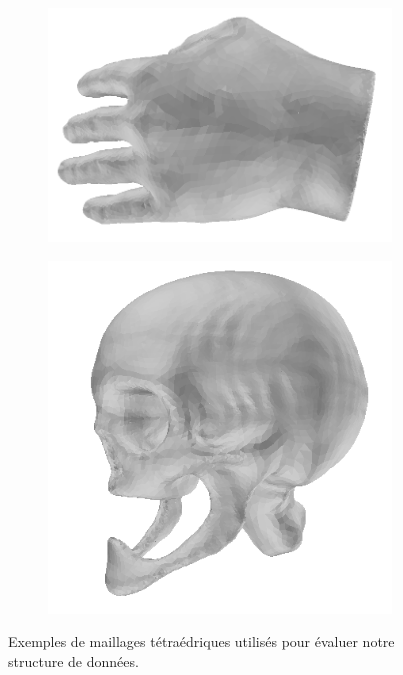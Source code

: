 \begin{figure}[th]
\begin{subfigure}{.24\textwidth}
  \centering
  \includegraphics[scale=0.12]{Images/hand}
\end{subfigure}%
\begin{subfigure}{.24\textwidth}
  \centering
  \includegraphics[scale=0.14]{Images/skull}
\end{subfigure}
\caption{Exemples de maillages tétraédriques utilisés pour évaluer notre structure de données.}
\label{fig:exemples_maillages}
\end{figure}

